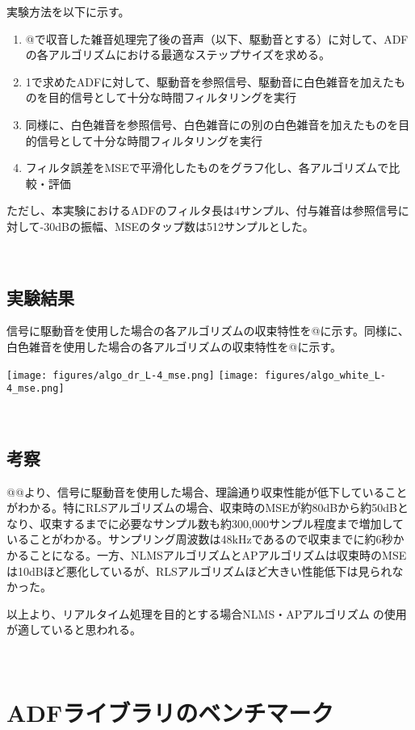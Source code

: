実験方法を以下に示す。

\begin{enumerate}
\renewcommand{\labelenumi}{(\arabic{enumi})}
\tightlist
\item
  @で収音した雑音処理完了後の音声（以下、駆動音とする）に対して、ADFの各アルゴリズムにおける最適なステップサイズを求める。
\item
  1で求めたADFに対して、駆動音を参照信号、駆動音に白色雑音を加えたものを目的信号として十分な時間フィルタリングを実行
\item
  同様に、白色雑音を参照信号、白色雑音にの別の白色雑音を加えたものを目的信号として十分な時間フィルタリングを実行
\item
  フィルタ誤差をMSEで平滑化したものをグラフ化し、各アルゴリズムで比較・評価
\end{enumerate}

ただし、本実験におけるADFのフィルタ長は4サンプル、付与雑音は参照信号に対して-30dBの振幅、MSEのタップ数は512サンプルとした。

\
\subsection{実験結果}\label{result-color}

信号に駆動音を使用した場合の各アルゴリズムの収束特性を@に示す。同様に、白色雑音を使用した場合の各アルゴリズムの収束特性を@に示す。

\texttt{[image: figures/algo\_dr\_L-4\_mse.png]}
\texttt{[image: figures/algo\_white\_L-4\_mse.png]}

\
\subsection{考察}\label{consideration-color}

@@より、信号に駆動音を使用した場合、理論通り収束性能が低下していることがわかる。特にRLSアルゴリズムの場合、収束時のMSEが約80dBから約50dBとなり、収束するまでに必要なサンプル数も約300,000サンプル程度まで増加していることがわかる。サンプリング周波数は48kHzであるので収束までに約6秒かかることになる。一方、NLMSアルゴリズムとAPアルゴリズムは収束時のMSEは10dBほど悪化しているが、RLSアルゴリズムほど大きい性能低下は見られなかった。

以上より、リアルタイム処理を目的とする場合NLMS・APアルゴリズムの使用が適していると思われる。

\
\section{ADFライブラリのベンチマーク}\label{benchmark}

